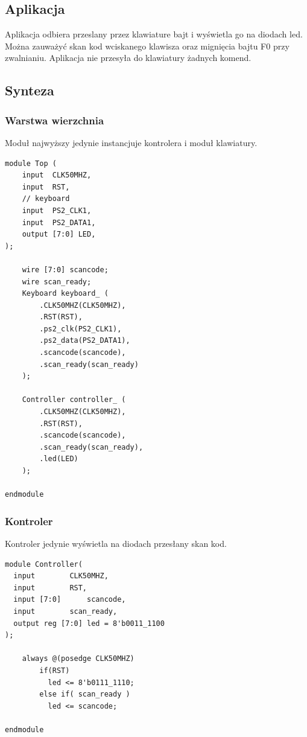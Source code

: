 \documentclass[a4paper,12pt]{article}
\begin{document}
\subsection{Aplikacja}

Aplikacja odbiera przeslany przez klawiature bajt i wyświetla go na diodach led. Można zauważyć skan kod wciskanego klawisza oraz mignięcia bajtu F0 przy zwalnianiu. Aplikacja nie przesyła do klawiatury żadnych komend.

\subsection{Synteza}

\subsubsection{Warstwa wierzchnia}
Moduł najwyższy jedynie instancjuje kontrolera i moduł klawiatury.
\begin{lstlisting}[label=Top,caption=Top.v]
module Top (
    input  CLK50MHZ,
    input  RST,
    // keyboard
    input  PS2_CLK1,
    input  PS2_DATA1,
    output [7:0] LED,
);

    wire [7:0] scancode;
    wire scan_ready;
    Keyboard keyboard_ (
        .CLK50MHZ(CLK50MHZ),
        .RST(RST),
        .ps2_clk(PS2_CLK1),
        .ps2_data(PS2_DATA1),
        .scancode(scancode),
        .scan_ready(scan_ready)
    );

    Controller controller_ (
        .CLK50MHZ(CLK50MHZ),
        .RST(RST),
        .scancode(scancode),
        .scan_ready(scan_ready),
        .led(LED)
    );

endmodule
\end{lstlisting}

\subsubsection{Kontroler}
Kontroler jedynie wyświetla na diodach przesłany skan kod.
\begin{lstlisting}[label=Controller,caption=Controller.v]
module Controller(
  input 	   CLK50MHZ,
  input 	   RST,
  input [7:0] 	   scancode,
  input 	   scan_ready,
  output reg [7:0] led = 8'b0011_1100
);

    always @(posedge CLK50MHZ)
        if(RST)
          led <= 8'b0111_1110;
        else if( scan_ready )
          led <= scancode;

endmodule
\end{lstlisting}
\end{document}
